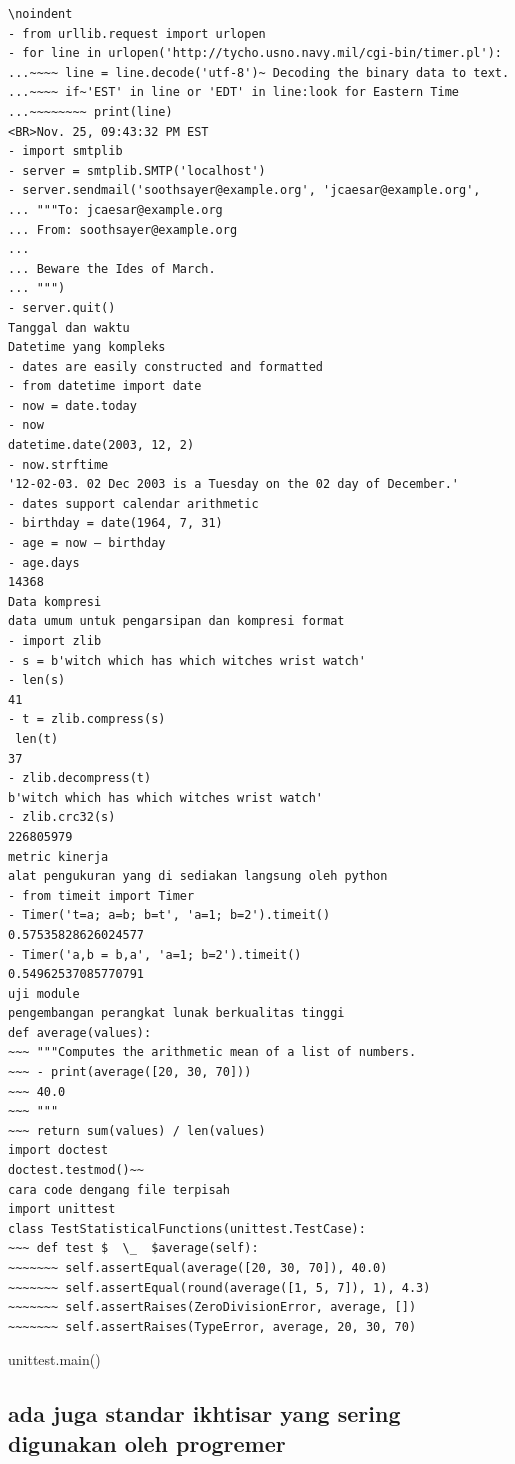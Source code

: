 {{{{{{{{{{{{{\begin{verbatim}
\noindent 
- from urllib.request import urlopen
- for line in urlopen('http://tycho.usno.navy.mil/cgi-bin/timer.pl'): 
...~~~~ line = line.decode('utf-8')~ Decoding the binary data to text.
...~~~~ if~'EST' in line or 'EDT' in line:look for Eastern Time  
...~~~~~~~~ print(line) 
<BR>Nov. 25, 09:43:32 PM EST
- import smtplib
- server = smtplib.SMTP('localhost') 
- server.sendmail('soothsayer@example.org', 'jcaesar@example.org',  
... """To: jcaesar@example.org 
... From: soothsayer@example.org  
...  
... Beware the Ides of March. 
... """) 
- server.quit() 
Tanggal dan waktu  
Datetime yang kompleks 
- dates are easily constructed and formatted 
- from datetime import date 
- now = date.today
- now 
datetime.date(2003, 12, 2) 
- now.strftime
'12-02-03. 02 Dec 2003 is a Tuesday on the 02 day of December.' 
- dates support calendar arithmetic 
- birthday = date(1964, 7, 31) 
- age = now – birthday 
- age.days 
14368  
Data kompresi 
data umum untuk pengarsipan dan kompresi format 
- import zlib  
- s = b'witch which has which witches wrist watch' 
- len(s) 
41  
- t = zlib.compress(s) 
 len(t) 
37  
- zlib.decompress(t)  
b'witch which has which witches wrist watch' 
- zlib.crc32(s) 
226805979
metric kinerja 
alat pengukuran yang di sediakan langsung oleh python 
- from timeit import Timer
- Timer('t=a; a=b; b=t', 'a=1; b=2').timeit()
0.57535828626024577
- Timer('a,b = b,a', 'a=1; b=2').timeit() 
0.54962537085770791 
uji module 
pengembangan perangkat lunak berkualitas tinggi 
def average(values): 
~~~ """Computes the arithmetic mean of a list of numbers.  
~~~ - print(average([20, 30, 70]))  
~~~ 40.0  
~~~ """  
~~~ return sum(values) / len(values) 
import doctest 
doctest.testmod()~~  
cara code dengang file terpisah 
import unittest 
class TestStatisticalFunctions(unittest.TestCase): 
~~~ def test $  \_  $average(self): 
~~~~~~~ self.assertEqual(average([20, 30, 70]), 40.0) 
~~~~~~~ self.assertEqual(round(average([1, 5, 7]), 1), 4.3) 
~~~~~~~ self.assertRaises(ZeroDivisionError, average, []) 
~~~~~~~ self.assertRaises(TypeError, average, 20, 30, 70)
\end{verbatim}
unittest.main()  \par
\vspace{\baselineskip}
\noindent 
{\fontsize{14pt}{14pt}\subsection
{ada juga standar ikhtisar yang sering digunakan oleh progremer}
\vspace{\baselineskip}
}}}}}}}}}}}}}}
